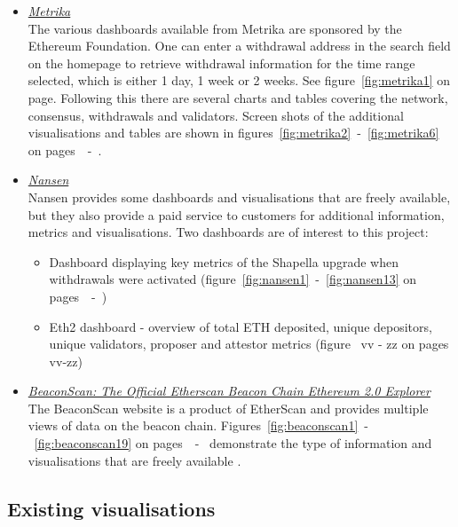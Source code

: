 \documentclass[UTF8]{article}
\begin{document}
\begin{itemize}
	\item \textit{\href{https://app.metrika.co/ethereum/}{Metrika}} \\
	The various dashboards available from Metrika are sponsored by the Ethereum Foundation. One can enter a withdrawal address in the search field on the homepage to retrieve withdrawal information for the time range selected, which is either 1 day, 1 week or 2 weeks. See figure~\ref{fig:metrika1} on page\pageref{fig:metrika1}. Following this there are several charts and tables covering the network, consensus, withdrawals and validators. Screen shots of the additional visualisations and tables are shown in figures~\ref{fig:metrika2}~-~\ref{fig:metrika6} on pages~\pageref{fig:metrika2}~-~\pageref{fig:metrika6}.
	
	\item \textit{\href{https://pro.nansen.ai/}{Nansen}}\\
	Nansen provides some dashboards and visualisations that are freely available, but they also provide a paid service to customers for additional information, metrics and visualisations.
	Two dashboards are of interest to this project:
	\begin{itemize}
		\item Dashboard displaying key metrics of the Shapella upgrade when withdrawals were activated (figure~\ref{fig:nansen1}~-~\ref{fig:nansen13} on pages~\pageref{fig:nansen1}~-~\pageref{fig:nansen13}) \cite{nansenshapella}
		\item Eth2 dashboard  - overview of total ETH deposited, unique depositors, unique validators, proposer and attestor metrics (figure~ vv - zz on pages vv-zz) \cite{nanseneth2}
	\end{itemize}
	\item \textit{\href{https://beaconscan.com}{BeaconScan: The Official Etherscan Beacon Chain Ethereum 2.0 Explorer}}\\
	The BeaconScan website is a product of EtherScan and provides multiple views of data on the beacon chain. Figures~\ref{fig:beaconscan1}~-~\ref{fig:beaconscan19} on pages~\pageref{fig:beaconscan1}~-~\pageref{fig:beaconscan19} demonstrate the type of information and visualisations that are freely available \cite{etherscan}.
\end{itemize}

\clearpage

\subsection{Existing visualisations}
\end{document}
